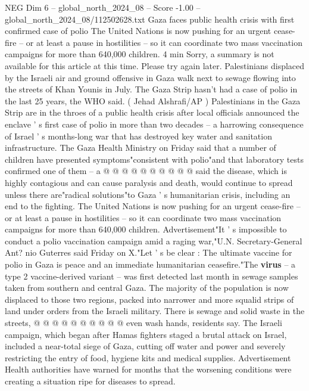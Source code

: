 \begin{textsample}{NEG Dim 6 – global\_north\_2024\_08 – Score -1.00 – global\_north\_2024\_08/112502628.txt}  \label{ex:f6_neg_158}
Gaza faces public health crisis with first confirmed case of polio The United Nations is now pushing for an urgent cease-fire -- or at least a pause in hostilities -- so it can coordinate two mass vaccination campaigns for more than 640,000 children. 4 min Sorry, a summary is not available for this article at this time.
Please try again later.
Palestinians displaced by the Israeli air and ground offensive in Gaza walk next to sewage flowing into the streets of Khan Younis in July.
The Gaza Strip hasn't had a case of polio in the last 25 years, the WHO said. ( Jehad Alshrafi/AP ) Palestinians in the Gaza Strip are in the throes of a public health crisis after local officials announced the enclave ' s first case of polio in more than two decades -- a harrowing consequence of Israel ' s months-long war that has destroyed key water and sanitation infrastructure.
The Gaza Health Ministry on Friday said that a number of children have presented symptoms"consistent with polio"and that laboratory tests confirmed one of them -- a @ @ @ @ @ @ @ @ @ @ said the disease, which is highly contagious and can cause paralysis and death, would continue to spread unless there are"radical solutions"to Gaza ' s humanitarian crisis, including an end to the fighting.
The United Nations is now pushing for an urgent cease-fire -- or at least a pause in hostilities -- so it can coordinate two mass vaccination campaigns for more than 640,000 children.
Advertisement"It ' s impossible to conduct a polio vaccination campaign amid a raging war,"U.N.
Secretary-General Ant? nio Guterres said Friday on X."Let ' s be clear : The ultimate vaccine for polio in Gaza is peace and an immediate humanitarian ceasefire."The \textbf{virus} -- a type 2 vaccine-derived variant -- was first detected last month in sewage samples taken from southern and central Gaza.
The majority of the population is now displaced to those two regions, packed into narrower and more squalid strips of land under orders from the Israeli military.
There is sewage and solid waste in the streets, @ @ @ @ @ @ @ @ @ @ even wash hands, residents say.
The Israeli campaign, which began after Hamas fighters staged a brutal attack on Israel, included a near-total siege of Gaza, cutting off water and power and severely restricting the entry of food, hygiene kits and medical supplies.
Advertisement Health authorities have warned for months that the worsening conditions were creating a situation ripe for diseases to spread.

\end{textsample}
